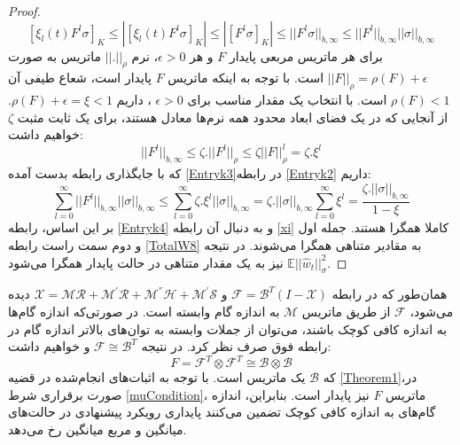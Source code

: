 \begin{proof}
	\begin{equation}\label{Entryk2}
		[\xi_l(t) F^l \sigma]_K\le |[\xi_l(t) F^l \sigma]_K|\le |[ F^l \sigma]_K|\le ||F^l \sigma||_{b,\infty}\le ||F^l||_{b,\infty} ||\sigma||_{b,\infty}
	\end{equation}
	برای هر ماتریس مربعی پایدار $F$ و هر $\epsilon>0$، نرم $||.||_\rho$ ماتریس به صورت $||F||_\rho=\rho(F)+\epsilon$ است. با توجه به اینکه ماتریس $F$ پایدار است، شعاع طیفی آن $\rho(F)<1$ است. با انتخاب یک مقدار مناسب برای $\epsilon>0$ ، داریم $\rho(F)+\epsilon=\xi<1$. از آنجایی که در یک فضای ابعاد محدود همه نرم‌ها معادل هستند، برای یک ثابت مثبت $\zeta$ خواهیم داشت:
	\begin{equation}\label{Entryk3}
		||F^l||_{b,\infty}\le \zeta . ||F^l||_{\rho}\le \zeta ||F||^l_{\rho}=\zeta . \xi^l
	\end{equation}
	که با جایگذاری رابطه بدست آمده \ref{Entryk3}در رابطه \ref{Entryk2} داریم:
	\begin{equation}\label{Entryk4}
		\sum_{l=0}^{\infty} ||F^l||_{b,\infty} ||\sigma||_{b,\infty}\le  \sum_{l=0}^{\infty} \zeta . \xi^l ||\sigma||_{b,\infty}=\zeta . ||\sigma||_{b,\infty} \sum_{l=0}^{\infty} \xi^l=\frac{\zeta . ||\sigma||_{b,\infty}}{1-\xi}
	\end{equation}
	بر این اساس، رابطه \ref{Entryk4} و به دنبال آن رابطه \ref{xi} کاملا همگرا هستند. جمله اول و دوم سمت راست رابطه \ref{TotalW8} به مقادیر متناهی همگرا می‌شوند. در نتیجه $\mathbb{E}||\hat{w}_t||^2_{\sigma}$ نیز به یک مقدار متناهی در حالت پایدار همگرا می‌شود. 
\end{proof}
همان‌طور که در رابطه $\mathcal{F}=\mathcal{B}^T(I-\mathcal{X})$ و  $\mathcal{X}=\mathcal{M}\mathcal{R}+\mathcal{M}^{'}\mathcal{R}+\mathcal{M}^{''}\mathcal{H}+\mathcal{M}^{'}\mathcal{S}$ دیده می‌شود، $\mathcal{F}$ از طریق ماتریس $\mathcal{M}$ به اندازه گام وابسته است. در صورتی‌که اندازه گام‌ها به اندازه کافی کوچک باشند، می‌توان از جملات وابسته به توان‌های بالاتر اندازه گام در رابطه فوق صرف نظر کرد. در نتیجه $\mathcal{F}\cong \mathcal{B}^T$ و خواهیم داشت:
\begin{equation}
	F=\mathcal{F}^T\otimes\mathcal{F}^T\cong \mathcal{B}\otimes\mathcal{B}
\end{equation}
که $\mathcal{B}$ یک ماتریس  است. با توجه به اثبات‌های انجام‌شده در قضیه \ref{Theorem1}،در صورت برقراری شرط \ref{muCondition}، ماتریس $F$ نیز پایدار است. بنابراین، اندازه گام‌های به اندازه کافی کوچک تضمین می‌کنند پایداری رویکرد پیشنهادی در حالت‌های میانگین و مربع میانگین رخ می‌دهد. 

